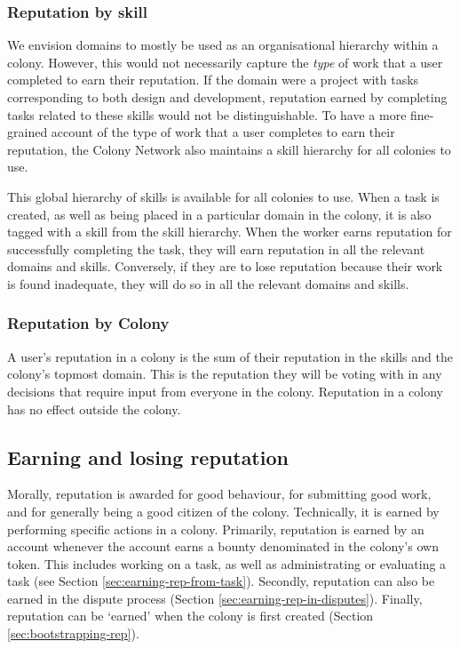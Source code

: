 \subsubsection{Reputation by skill}\label{sec:rep-by-skill}

We envision domains to mostly be used as an organisational hierarchy within a colony. However, this would not necessarily capture the \emph{type} of work that a user completed to earn their reputation. If the domain were a project with tasks corresponding to both design and development, reputation earned by completing tasks related to these skills would not be distinguishable.  To have a more fine-grained account of the type of work that a user completes to earn their reputation, the Colony Network also maintains a skill hierarchy for all colonies to use.

This global hierarchy of skills is available for all colonies to use. When a task is created, as well as being placed in a particular domain in the colony, it is also tagged with a skill from the skill hierarchy. When the worker earns reputation for successfully completing the task, they will earn reputation in all the relevant domains and skills. Conversely, if they are to lose reputation because their work is found inadequate, they will do so in all the relevant domains and skills.

\subsubsection{Reputation by Colony}\label{sec:rep-by-colony}
A user's reputation in a colony is the sum of their reputation in the skills and the colony's topmost domain. This is the reputation they will be voting with in any decisions that require input from everyone in the colony. Reputation in a colony has no effect outside the colony.



\subsection{Earning and losing reputation}\label{sec:earning-losing-rep}
Morally, reputation is awarded for good behaviour, for submitting good work, and for generally being a good citizen of the colony. Technically, it is earned by performing specific actions in a colony. Primarily, reputation is earned by an account whenever the account earns a bounty denominated in the colony's own token. This includes working on a task, as well as administrating or evaluating a task (see Section \ref{sec:earning-rep-from-task}). Secondly, reputation can also be earned in the dispute process (Section \ref{sec:earning-rep-in-disputes}). Finally, reputation can be `earned' when the colony is first created (Section \ref{sec:bootstrapping-rep}).

